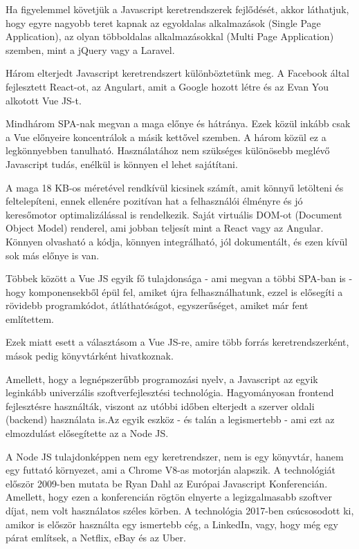 

Ha figyelemmel követjük a Javascript keretrendszerek fejlődését, akkor láthatjuk, hogy egyre nagyobb teret kapnak az egyoldalas alkalmazások (Single Page Application), az olyan többoldalas alkalmazásokkal (Multi Page Application) szemben, mint a jQuery vagy a Laravel.

Három elterjedt Javascript keretrendszert különböztetünk meg. A Facebook által fejlesztett React-ot, az Angulart, amit a Google hozott létre és az Evan You alkotott Vue JS-t.


Mindhárom SPA-nak megvan a maga előnye és hátránya. Ezek közül inkább csak a Vue előnyeire koncentrálok a másik kettővel szemben. A három közül ez a legkönnyebben tanulható. Használatához nem szükséges különösebb meglévő Javascript tudás, enélkül is könnyen el lehet sajátítani.

A maga 18 KB-os méretével rendkívül kicsinek számít, amit könnyű letölteni és feltelepíteni, ennek ellenére pozitívan hat a felhasználói élményre és jó keresőmotor optimalizálással is rendelkezik. Saját virtuális DOM-ot (Document Object Model) renderel, ami jobban teljesít mint a React vagy az Angular. Könnyen olvasható a kódja, könnyen integrálható, jól dokumentált, és ezen kívül sok más előnye is van.

Többek között a Vue JS egyik fő tulajdonsága - ami megvan a többi SPA-ban is - hogy komponensekből épül fel, amiket újra felhasználhatunk, ezzel is elősegíti a rövidebb programkódot, átláthatóságot, egyszerűséget, amiket már fent említettem.

Ezek miatt esett a választásom a Vue JS-re, amire több forrás keretrendszerként, mások pedig könyvtárként hivatkoznak.


Amellett, hogy a legnépszerűbb programozási nyelv, a Javascript az egyik leginkább univerzális szoftverfejlesztési technológia. Hagyományosan frontend fejlesztésre használták, viszont az utóbbi időben elterjedt a szerver oldali (backend) használata is.Az egyik eszköz - és talán a legismertebb - ami ezt az elmozdulást elősegítette az a Node JS.

A Node JS tulajdonképpen nem egy keretrendszer, nem is egy könyvtár, hanem egy futtató környezet, ami a Chrome V8-as motorján alapszik. A technológiát először 2009-ben mutata be Ryan Dahl az Európai Javascript Konferencián. Amellett, hogy ezen a konferencián rögtön elnyerte a legizgalmasabb szoftver díjat, nem volt használatos széles körben. A technológia 2017-ben csúcsosodott ki, amikor is először használta egy ismertebb cég, a LinkedIn, vagy, hogy még egy párat említsek, a Netflix, eBay és az Uber.


